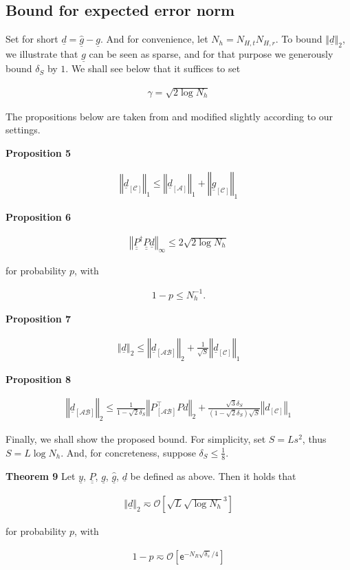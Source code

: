 \documentclass[journal]{IEEEtran}
\newcommand {\g} {\gamma}
\renewcommand {\d} {\delta}
\newcommand {\m} [1] {\( #1 \)}
\newcommand {\V} [1] {\underline {#1}}
\newcommand {\M} [1] {\underline {\underline {#1}}}
\newcommand {\RB} [1] {\left( #1 \right)}
\newcommand {\SB} [1] {\left[ #1 \right]}
\newcommand {\VNm} [1] {\left \Vert #1 \right \Vert}
\newcommand {\R} [1] {\sqrt {#1}}
\newcommand {\Disp} [1] {
   \begin {align*}
      #1
   \end {align*}
}
\begin{document}

\subsection {Bound for expected error norm}

Set for short \m {\V {d} = \hat {\V {g}} - \V {g}}.
And for convenience, let \m {N_h = N_{H,t} N_{H,r}}.
%
To bound \m {\VNm {\V {d}} _2}, we illustrate that \m {\V {g}} can be seen as sparse, and for that purpose we generously bound \m {\d_{S}} by \m {1}.
We shall see below that it suffices to set
\Disp {
\g
= \R {2 \log N_h} 
}

The propositions below are taken from \cite {CaT07} and modified slightly according to our settings.

\textbf {Proposition 5}
\Disp {
\VNm {\V {d} _{\SB{\mathcal {C}}}} _1
\leq \VNm {\V {d} _{\SB{\mathcal {A}}}} _1
+\VNm {\V {g} _{\SB{\mathcal {C}}}} _1 
}

\textbf {Proposition 6}
\Disp {
\VNm {\M {P}^\dagger \M {P} \V {d}} _\infty
\leq 2 \R {2 \log N_h} 
}
for probability \m {p}, with
\Disp {
1 -p
\leq N_h^{-1}.
}

\textbf {Proposition 7}
\Disp {
\VNm {\V {d}} _2
\leq \VNm {\V {d} _{\SB {\mathcal {AB}}}} _2 + \frac {1} {\R {S}} \VNm {\V {d} _{\SB{\mathcal {C}}}} _1 
}

\textbf {Proposition 8}
\Disp {
\VNm {\V {d} _{\SB{\mathcal {AB}}}} _2
\leq \frac {1} {1- \R{2} \d_{S}} \VNm {P _{\SB {\mathcal {AB}}}^\intercal P d} _2
+ \frac {\R{3} \d_{S}} {\RB {1- \R{2} \d_{S}} \R {S}} \VNm {d_{\SB{\mathcal {C}}}} _1 
}

Finally, we shall show the proposed bound.
For simplicity, set \m {S = Ls^2}, thus \m {S =L \log N_h}.
And, for concreteness, suppose \m {\d_S \leq \frac {1} {8}}.

\textbf {Theorem 9}
Let \m {\V {y}}, \m {\M {P}}, \m {\V {g}}, \m {\hat {\V {g}}}, \m {\V {d}} be defined as above.
Then it holds that
\Disp {
\VNm {\V {d}} _2
\eqsim \mathcal {O} \SB {\R {L} \R {\log N_h}^3} 
}
for probability \m {p}, with
\Disp {
1 -p
\eqsim \mathcal {O} \SB {\mathsf {e} ^{-N_R \R {\d_s} /4}} 
}
\end{document}
